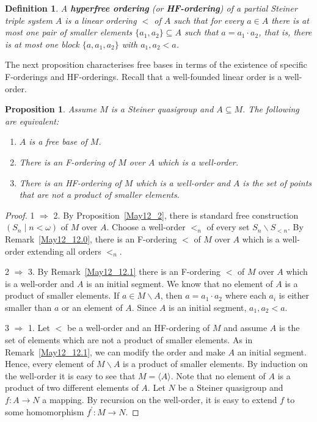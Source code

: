 \documentclass[a4paper, 11pt]{article}
\theoremstyle{note}
\newtheorem{df}[thm]{Definition}
\newtheorem{prop}[thm]{Proposition}
\begin{document}
	\begin{df} A \textbf{hyperfree ordering}  (or \textbf{HF-ordering}) of a partial Steiner triple system $A$ is a linear ordering $<$ of $A$ such that for every $a\in A$ there is at most one pair of smaller elements $\{a_1,a_2\}\subseteq A$ such that $a=a_1\cdot a_2$, that is, there is at most one block $\{a,a_1,a_2\}$ with $a_1,a_2<a$.
	\end{df}
The next proposition characterises free bases in terms of the existence of specific F-orderings and HF-orderings. Recall that a well-founded linear order is a well-order.
	\begin{prop}\label{May12_2.2} Assume $M$ is a Steiner quasigroup and $A\subseteq M$. The following are equivalent:
		\begin{enumerate}
			\item $A$ is a free base of $M$.
			\item There is an F-ordering of $M$ over $A$ which is a well-order.
			\item There is an HF-ordering of $M$ which is a well-order and $A$ is the set of points that are not a product of smaller elements.
		\end{enumerate}
		\end{prop}
		\begin{proof}
			1 $\Rightarrow$ 2. By Proposition~\ref{May12_2}, there is standard free construction $(S_n\mid n<\omega)$ of $M$ over $A$. Choose a well-order $<_n$ of every set $S_n\smallsetminus S_{<n}$. By Remark~\ref{May12_12.0}, there is an F-ordering $<$ of $M$ over $A$ which is a well-order extending all orders $<_n$.
			
			2 $\Rightarrow$ 3. By Remark~\ref{May12_12.1} there is an F-ordering $<$ of $M$ over $A$ which is a well-order and $A$ is an initial segment. We know that no element of $A$ is a product of smaller elements. If $a\in M\smallsetminus A$, then $a= a_1\cdot a_2$ where each $a_i$ is either smaller than $a$ or an element of $A$. Since $A$ is an initial segment, $a_1,a_2 <a$.
			
			3 $\Rightarrow$ 1.  Let $<$ be a well-order and an HF-ordering of $M$ and assume $A$ is the set of elements which are not a product of smaller elements. As in Remark~\ref{May12_12.1}, we can modify the order and make $A$ an initial segment. Hence, every element of $M\smallsetminus A$ is a product of smaller elements. By induction on the well-order it is easy to see that $M=\langle A\rangle$. Note that no element of $A$ is a product of two different elements of $A$. Let $N$ be a Steiner quasigroup and $f:A\rightarrow N$ a  mapping. By recursion on the well-order, it is easy to extend $f$ to some homomorphism $f^\prime:M\rightarrow N$.
		\end{proof}
\end{document}
